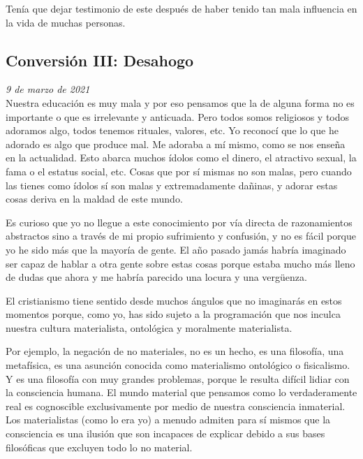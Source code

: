 \documentclass[12pt]{article}
\begin{document}
	Tenía que dejar testimonio de este  después de
	haber tenido tan mala influencia en la vida de muchas personas.

	\newpage

	\subsection{Conversión III: Desahogo}

	\textit{9 de marzo de 2021}\\

	Nuestra educación es muy mala y por eso pensamos que la
	 de alguna forma no es importante o que es
	irrelevante y anticuada. Pero todos somos religiosos y todos adoramos
	algo, todos tenemos rituales, valores, etc. Yo reconocí que lo que he
	adorado es algo que produce mal. Me adoraba a mí mismo, como se nos
	enseña en la actualidad. Esto abarca muchos ídolos como el dinero, el
	atractivo sexual, la fama o el estatus social, etc. Cosas que por sí
	mismas no son malas, pero cuando las tienes como ídolos sí son malas y
	extremadamente dañinas, y adorar estas cosas deriva en la maldad de este
	mundo.

	Es curioso que yo no llegue a este conocimiento por vía directa de
	razonamientos abstractos sino a través de mi propio sufrimiento y
	confusión, y no es fácil porque yo he sido más  que la
	mayoría de gente. El año pasado jamás habría imaginado ser capaz de
	hablar a otra gente sobre estas cosas porque estaba mucho más lleno de
	dudas que ahora y me habría parecido una locura y una vergüenza.

	El cristianismo tiene sentido desde muchos ángulos que no imaginarás en
	estos momentos porque, como yo, has sido sujeto a la programación que
	nos inculca nuestra cultura materialista, ontológica y moralmente
	materialista.

	Por ejemplo, la negación de  no materiales, no es un
	hecho, es una filosofía, una metafísica, es una asunción conocida como
	materialismo ontológico o fisicalismo. Y es una filosofía con muy
	grandes problemas, porque le resulta difícil lidiar con la consciencia
	humana. El mundo material que pensamos como lo verdaderamente real es
	cognoscible exclusivamente por medio de nuestra consciencia inmaterial.
	Los materialistas (como lo era yo) a menudo admiten para sí mismos que
	la consciencia es una ilusión que son incapaces de explicar debido a sus
	bases filosóficas que excluyen todo lo no material.
\end{document}
